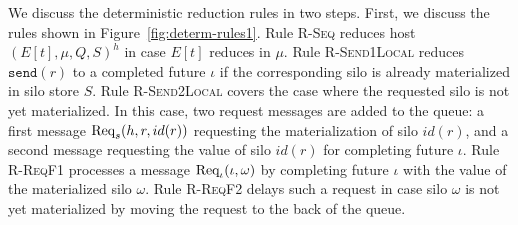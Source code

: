 
We discuss the deterministic reduction rules in two steps. First, we
discuss the rules shown in Figure~\ref{fig:determ-rules1}. Rule
\textsc{R-Seq} reduces host $(E[t], \mu, Q, S)^h$ in case $E[t]$
reduces in $\mu$. Rule \textsc{R-Send1Local} reduces
$\texttt{send}(r)$ to a completed future $\iota$ if the corresponding
silo is already materialized in silo store $S$. Rule
\textsc{R-Send2Local} covers the case where the requested silo is not
yet materialized. In this case, two request messages are added to the
queue: a first message ${\textrm{Req}_s(h, r, id(r))}$ requesting the
materialization of silo $id(r)$, and a second message requesting the
value of silo $id(r)$ for completing future $\iota$. Rule
\textsc{R-ReqF1} processes a message ${\textrm{Req}_{\iota}(\iota, \omega)}$ by
completing future $\iota$ with the value of the materialized silo
$\omega$. Rule \textsc{R-ReqF2} delays such a request in case silo
$\omega$ is not yet materialized by moving the request to the back of
the queue.


